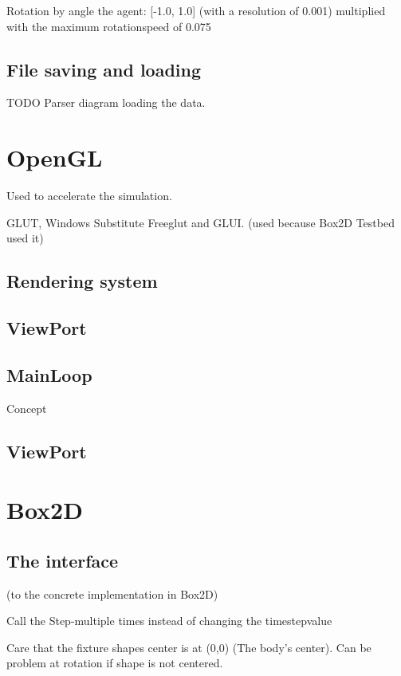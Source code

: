 \documentclass[10pt,a4paper,DIV=11]{scrreprt}
\begin{document}
Rotation by angle the agent: [-1.0, 1.0] (with a resolution of 0.001)
multiplied with the maximum rotationspeed of 0.075


\subsection{File saving and loading}

TODO Parser diagram loading the data.


\section{OpenGL}
Used to accelerate the simulation.


GLUT, Windows Substitute Freeglut and GLUI. (used because Box2D Testbed used it)

\subsection{Rendering system}

\subsection{ViewPort}

\subsection{MainLoop}

Concept

\subsection{ViewPort}

\section{Box2D}

\subsection{The interface}
(to the concrete implementation in Box2D)


Call the Step-multiple times instead of changing the timestepvalue

Care that the fixture shapes center is at (0,0) (The body's center). Can be problem at rotation if shape is not centered.
\end{document}
